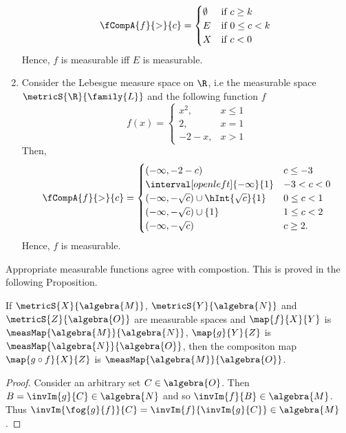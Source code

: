 \begin{Example}
\begin{enumerate}
	    \begin{equation*}
		\fCompA{f}{>}{c} = 
		\begin{cases}
		    \emptyset &\text{if $c \geq k$}\\
		    E &\text{if $0\leq c < k$ }\\
		    X &\text{if $c < 0$}
		\end{cases}
	    \end{equation*}
	    Hence, $f$ is measurable iff $E$ is measurable.
	\item
	    Consider the Lebesgue measure space on $\R$, i.e the measurable space $\metricS{\R}{\family{L}}$ 
	    and the following function $f$
	    \begin{equation*}
		f(x) = 
		\begin{cases}
		    x^2, & x \leq 1 \\
		    2, & x = 1 \\
		    -2-x, & x > 1
		\end{cases}
	    \end{equation*}
	    Then,
	    \begin{equation*}
		\fCompA{f}{>}{c} = 
		\begin{cases}
		    (-\infty,-2-c) & c \leq -3 \\
		    \interval[open left]{-\infty}{1} & -3 < c < 0  \\
		    (-\infty,-\sqrt{c})\cup\hInt{\sqrt{c}}{1} & 0 \leq c < 1  \\
		    (-\infty,-\sqrt{c}) \cup \lbrace 1 \rbrace & 1\leq  c < 2 \\
		    (-\infty,-\sqrt{c}) & c \geq 2.
		\end{cases}
	    \end{equation*}
	    Hence, $f$ is measurable.
    \end{enumerate}
\end{Example}
Appropriate measurable functions agree with compostion. This is proved in the following Proposition.
\begin{Proposition}[name=Composing measurable functions]\label{prop:composition_meas_func}
    If $\metricS{X}{\algebra{M}}$, $\metricS{Y}{\algebra{N}}$ and $\metricS{Z}{\algebra{O}}$ are 
    measurable spaces and $\map{f}{X}{Y}$ is
    $\measMap{\algebra{M}}{\algebra{N}}$, $\map{g}{Y}{Z}$ is $\measMap{\algebra{N}}{\algebra{O}}$, then the
    compositon map $\map{g\circ f}{X}{Z}$ is $\measMap{\algebra{M}}{\algebra{O}}$.
\end{Proposition}
\begin{proof}
    Consider an arbitrary set $C \in \algebra{O}$. Then $B = \invIm{g}{C} \in \algebra{N}$ and so 
    $\invIm{f}{B} \in \algebra{M}$. Thus $\invIm{\fog{g}{f}}{C} = \invIm{f}{\invIm{g}{C}} \in \algebra{M}$.
\end{proof}
